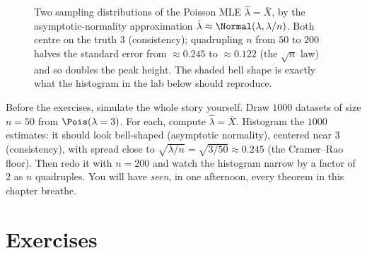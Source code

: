\begin{figure}[H]
\centering
{}
\caption{Two sampling distributions of the Poisson MLE $\hat\lambda=\bar X$, by
the asymptotic-normality approximation $\hat\lambda\approx\Normal(\lambda,
\lambda/n)$. Both centre on the truth $3$ (consistency); quadrupling $n$ from
$50$ to $200$ halves the standard error from $\approx 0.245$ to $\approx 0.122$
(the $\sqrt n$ law) and so doubles the peak height. The shaded bell shape is
exactly what the histogram in the lab below should reproduce.}
\label{ch30:fig-sampling-narrow}
\end{figure}

\begin{labbox}
Before the exercises, simulate the whole story yourself. Draw $1000$ datasets of
size $n=50$ from $\Pois(\lambda=3)$. For each, compute $\hat\lambda=\bar X$.
Histogram the $1000$ estimates: it should look bell-shaped (asymptotic
normality), centered near $3$ (consistency), with spread close to
$\sqrt{\lambda/n}=\sqrt{3/50}\approx 0.245$ (the Cramer--Rao floor). Then redo it
with $n=200$ and watch the histogram narrow by a factor of $2$ as $n$ quadruples.
You will have \emph{seen}, in one afternoon, every theorem in this chapter
breathe.
\end{labbox}

\section{Exercises}
\label{ch30:exercises}

